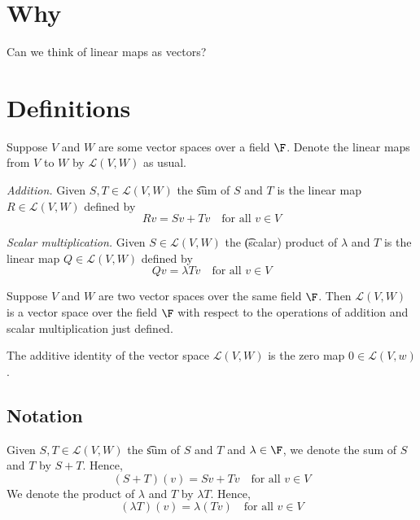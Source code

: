 
\section*{Why}

Can we think of linear maps as vectors?

\section*{Definitions}

Suppose $V$ and $W$ are some vector spaces over a field $\F $.
Denote the linear maps from $V$ to $W$ by $\mathcal{L} (V, W)$ as usual.

\textit{Addition.}
Given $S, T \in \mathcal{L} (V, W)$ the \t{sum} of $S$ and $T$ is the linear map $R \in \mathcal{L} (V, W)$ defined by
\[
Rv = Sv + Tv \quad \text{for all } v \in V
\]

\textit{Scalar multiplication.}
Given $S \in \mathcal{L} (V, W)$ the \t{(scalar) product} of $\lambda $ and $T$ is the linear map $Q \in \mathcal{L} (V, W)$ defined by
\[
Qv = \lambda Tv \quad \text{for all } v \in V
\]

\begin{proposition}
Suppose $V$ and $W$ are two vector spaces over the same field $\F $.
Then $\mathcal{L} (V, W)$ is a vector space over the field $\F $ with respect to the operations of addition and scalar multiplication just defined.
\end{proposition}

The additive identity of the vector space $\mathcal{L} (V, W)$ is the zero map $0 \in \mathcal{L} (V, w)$.

\subsection*{Notation}

Given $S, T \in \mathcal{L} (V, W)$ the \t{sum} of $S$ and $T$ and $\lambda  \in \F $, we denote the sum of $S$ and $T$ by $S + T$.
Hence,
\[
(S + T)(v) = Sv + Tv \quad \text{for all } v \in V
\]
We denote the product of $\lambda $ and $T$ by $\lambda T$.
Hence,
\[
(\lambda T)(v) = \lambda (Tv) \quad \text{for all } v \in V
\]

\blankpage